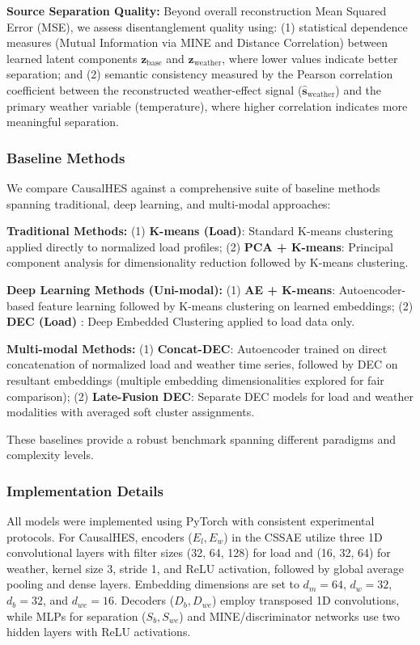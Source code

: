 \documentclass[journal]{IEEEtran}
\begin{document}
\textbf{Source Separation Quality:} Beyond overall reconstruction Mean Squared Error (MSE), we assess disentanglement quality using: (1) statistical dependence measures (Mutual Information via MINE and Distance Correlation) between learned latent components $\mathbf{z}_{\text{base}}$ and $\mathbf{z}_{\text{weather}}$, where lower values indicate better separation; and (2) semantic consistency measured by the Pearson correlation coefficient between the reconstructed weather-effect signal ($\hat{\mathbf{s}}_{\text{weather}}$) and the primary weather variable (temperature), where higher correlation indicates more meaningful separation.

\subsubsection{Baseline Methods}
We compare CausalHES against a comprehensive suite of baseline methods spanning traditional, deep learning, and multi-modal approaches:

\textbf{Traditional Methods:} (1) \textbf{K-means (Load)}: Standard K-means clustering applied directly to normalized load profiles; (2) \textbf{PCA + K-means}: Principal component analysis for dimensionality reduction followed by K-means clustering.

\textbf{Deep Learning Methods (Uni-modal):} (1) \textbf{AE + K-means}: Autoencoder-based feature learning followed by K-means clustering on learned embeddings; (2) \textbf{DEC (Load)} \cite{deep_embedding_clustering_xie}: Deep Embedded Clustering applied to load data only.

\textbf{Multi-modal Methods:} (1) \textbf{Concat-DEC}: Autoencoder trained on direct concatenation of normalized load and weather time series, followed by DEC on resultant embeddings (multiple embedding dimensionalities explored for fair comparison); (2) \textbf{Late-Fusion DEC}: Separate DEC models for load and weather modalities with averaged soft cluster assignments.

These baselines provide a robust benchmark spanning different paradigms and complexity levels.

\subsubsection{Implementation Details}
All models were implemented using PyTorch with consistent experimental protocols. For CausalHES, encoders ($E_l, E_w$) in the CSSAE utilize three 1D convolutional layers with filter sizes (32, 64, 128) for load and (16, 32, 64) for weather, kernel size 3, stride 1, and ReLU activation, followed by global average pooling and dense layers. Embedding dimensions are set to $d_m=64$, $d_w=32$, $d_b=32$, and $d_{we}=16$. Decoders ($D_b, D_{we}$) employ transposed 1D convolutions, while MLPs for separation ($S_b, S_{we}$) and MINE/discriminator networks use two hidden layers with ReLU activations.
\end{document}
